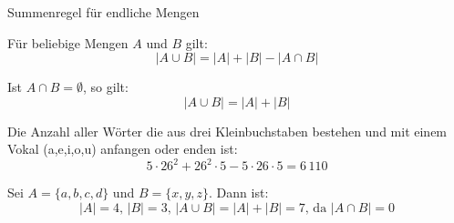 \documentclass[12pt,ngerman,a4paper,ignorenonframetext,]{beamer}
\begin{document}
\begin{frame}{Summenregel für endliche Mengen}
\protect\hypertarget{summenregel-fur-endliche-mengen}{}

\small


\begin{Satz}

Für beliebige Mengen \(A\) und \(B\) gilt:\vspace*{-.5em}
\begin{equation*} 
    |A \cup B| = |A| + |B| - |A \cap B| 
\end{equation*}

Ist \(A \cap B = \emptyset\), so gilt:\vspace*{-.5em} \begin{equation*} 
    |A \cup B| = |A| + |B| 
\end{equation*}

\small

\end{Satz}


\begin{Beispiel}

Die Anzahl aller Wörter die aus drei Kleinbuchstaben bestehen und mit
einem Vokal (a,e,i,o,u) anfangen oder enden ist:\vspace*{-.5em}
\begin{equation*}
    5 \cdot 26^2 + 26^2 \cdot 5 - 5 \cdot 26 \cdot 5 = 6\,110
\end{equation*}

\end{Beispiel}


\begin{Beispiel}[Mengen]

Sei \(A=\{a, b, c, d\}\) und \(B=\{x, y, z\}\). Dann ist:\vspace*{-.5em}
\begin{equation*}
    |A|=4,\, |B|=3,\, |A \cup B|= |A| + |B| = 7\text{, da }|A \cap B| = 0
\end{equation*}

\end{Beispiel}

\end{frame}
\end{document}
